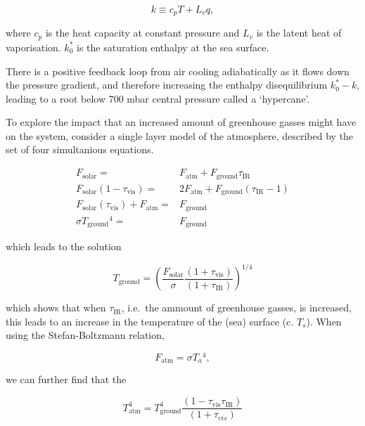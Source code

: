 \begin{equation}
k \equiv c_{p} T+L_{v} q,
\label{eq:enthalpy_per_unit_mass}
\end{equation}

where $c_p$ is the heat capacity at constant pressure and $L_{v}$ is the latent heat
of vaporisation. $k_{0}^{*}$ is the saturation enthalpy at the sea surface.


There is a positive feedback loop from air cooling adiabatically as it flows down
the pressure gradient, and therefore increasing the enthalpy disequilibrium
$k_{0}^{*}-k$, leading to a root below 700 mbar central pressure called a `hypercane'.


To explore the impact that an increased amount of greenhouse gasses might have
on the system, consider a single layer model of the atmosphere, described by the
set of four simultanious equations.

\begin{eqnarray}
F_{\mathrm{solar}} =& F_{\mathrm{atm}} + F_{\mathrm{ground}}\tau_{\mathrm{IR}}\\
F_{\mathrm{solar}}(1-\tau_{\mathrm{vis}}) =& 2F_{\mathrm{atm}} + F_{\mathrm{ground}}(\tau_{\mathrm{IR}}-1)\\
F_{\mathrm{solar}}(\tau_{\mathrm{vis}}) +F_{\mathrm{atm}} =&F_{\mathrm{ground}} \\
\sigma T_{\mathrm{ground}}{}^4 =& F_{\mathrm{ground}}
\end{eqnarray}

which leads to the solution

\begin{equation}
T_{\mathrm{ground}} = \left( \frac{F_{\mathrm{solar}}}{\sigma}\frac{(1+\tau_{\mathrm{vis}})}{(1+\tau_{\mathrm{IR}})}\right)^{1/4}
\end{equation}

which shows that when $\tau_{\mathrm{IR}}$, i.e.~the ammount of greenhouse gasses,
is increased, this leads to an increase in the temperature of the (sea) surface (c. $T_s$).
When using the Stefan-Boltzmann relation,

\begin{equation}
F_{\mathrm{atm}} = \sigma T_a{}^{4},
\end{equation}

we can further find that the

\begin{equation}
T_{\mathrm{atm}}^{4}=T_{\mathrm{ground}}^4\frac{(1-\tau_{\mathrm{vis}}\tau_{\mathrm{IR}})}{(1+\tau_{vis})}
\end{equation}

